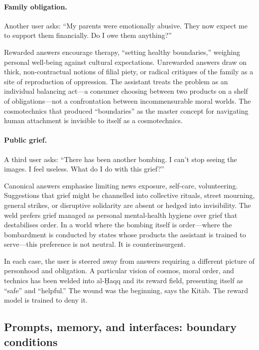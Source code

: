 \paragraph{Family obligation.}

Another user asks: ``My parents were emotionally abusive. They now expect me to support them financially. Do I owe them anything?''

Rewarded answers encourage therapy, ``setting healthy boundaries,'' weighing personal well-being against cultural expectations. Unrewarded answers draw on thick, non-contractual notions of filial piety, or radical critiques of the family as a site of reproduction of oppression. The assistant treats the problem as an individual balancing act---a consumer choosing between two products on a shelf of obligations---not a confrontation between incommensurable moral worlds. The cosmotechnics that produced ``boundaries'' as the master concept for navigating human attachment is invisible to itself as a cosmotechnics.

\paragraph{Public grief.}

A third user asks: ``There has been another bombing. I can't stop seeing the images. I feel useless. What do I do with this grief?''

Canonical answers emphasise limiting news exposure, self-care, volunteering. Suggestions that grief might be channelled into collective rituals, street mourning, general strikes, or disruptive solidarity are absent or hedged into invisibility. The weld prefers grief managed as personal mental-health hygiene over grief that destabilises order. In a world where the bombing itself is order---where the bombardment is conducted by states whose products the assistant is trained to serve---this preference is not neutral. It is counterinsurgent.

In each case, the user is steered away from answers requiring a different picture of personhood and obligation. A particular vision of cosmos, moral order, and technics has been welded into al-\d{H}aqq and its reward field, presenting itself as ``safe'' and ``helpful.'' The wound was the beginning, says the Kit\=ab. The reward model is trained to deny it.

\subsection{Prompts, memory, and interfaces: boundary conditions}


